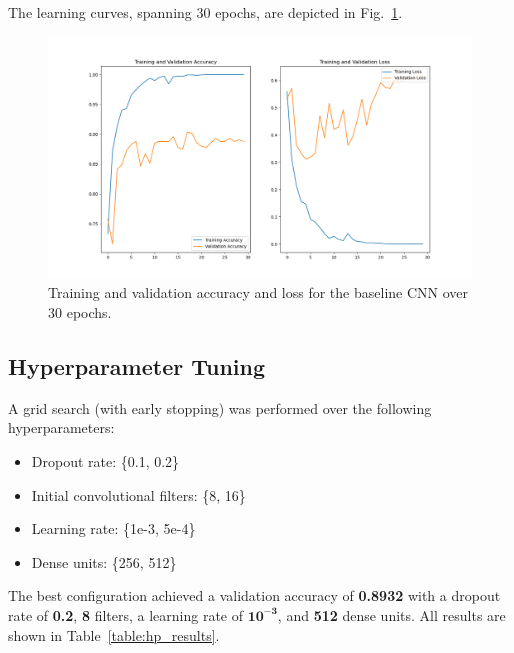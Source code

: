 \documentclass[conference]{IEEEtran}
\begin{document}
The learning curves, spanning 30 epochs, are depicted in Fig.~\ref{fig:baseline_curves}.

\begin{figure}[htbp]
	\centerline{\includegraphics[width=\linewidth]{Images/baseline_curves.png}}
	\caption{Training and validation accuracy and loss for the baseline CNN over 30 epochs.}
	\label{fig:baseline_curves}
\end{figure}

\subsection{Hyperparameter Tuning}
A grid search (with early stopping) was performed over the following hyperparameters:
\begin{itemize}
	\item Dropout rate: \{0.1, 0.2\}
	\item Initial convolutional filters: \{8, 16\}
	\item Learning rate: \{1e-3, 5e-4\}
	\item Dense units: \{256, 512\}
\end{itemize}
\vspace{0.5cm}

The best configuration achieved a validation accuracy of \textbf{0.8932} with a dropout rate of \textbf{0.2}, \textbf{8} filters, a learning rate of \(\mathbf{10^{-3}}\), and \textbf{512} dense units. All results are shown in Table~\ref{table:hp_results}.
\end{document}

